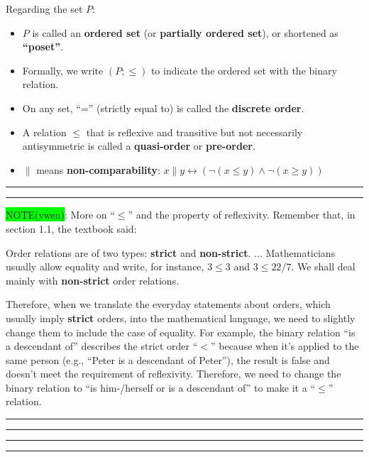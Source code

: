 \documentclass[12pt, letterpaper, oneside]{book}
\begin{document}
Regarding the set $P$:
\begin{itemize}
  \item $P$ is called an \textbf{ordered set} (or \textbf{partially ordered set}), or shortened as \textbf{``poset''}.
  \item Formally, we write $(P; \leqslant)$ to indicate the ordered set with the binary relation.
  \item On any set, ``='' (strictly equal to) is called the \textbf{discrete order}.
  \item A relation $\leqslant$ that is reflexive and transitive but not necessarily antisymmetric is called a
        \textbf{quasi-order} or \textbf{pre-order}.
  \item $\parallel$ means \textbf{non-comparability}: $x \parallel y \leftrightarrow (\lnot (x \leqslant y) \land \lnot (x \geqslant y))$
\end{itemize}

\noindent\rule[-9pt]{1cm}{10pt}\rule{10cm}{0.4pt}

\colorbox{lime}{NOTE(ywen)}: More on ``$\leqslant$'' and the property of reflexivity. Remember that, in section 1.1,
the textbook said:

\begin{displayquote}
  Order relations are of two types: \textbf{strict} and \textbf{non-strict}. ... Mathematicians usually allow equality
  and write, for instance, $3 \leqslant 3$ and $3 \leqslant 22/7$. We shall deal mainly with \textbf{non-strict} order
  relations.
\end{displayquote}

Therefore, when we translate the everyday statements about orders, which usually imply \textbf{strict} orders, into the
mathematical language, we need to slightly change them to include the case of equality. For example, the binary relation
``is a descendant of'' describes the strict order ``$<$'' because when it's applied to the same person (e.g., ``Peter
is a descendant of Peter''), the result is false and doesn't meet the requirement of reflexivity. Therefore, we need to
change the binary relation to ``is him-/herself or is a descendant of'' to make it a ``$\le$'' relation.

\noindent\rule{10cm}{0.4pt}\rule{1cm}{10pt}

\noindent\rule[-9pt]{1cm}{10pt}\rule{10cm}{0.4pt}
\end{document}
